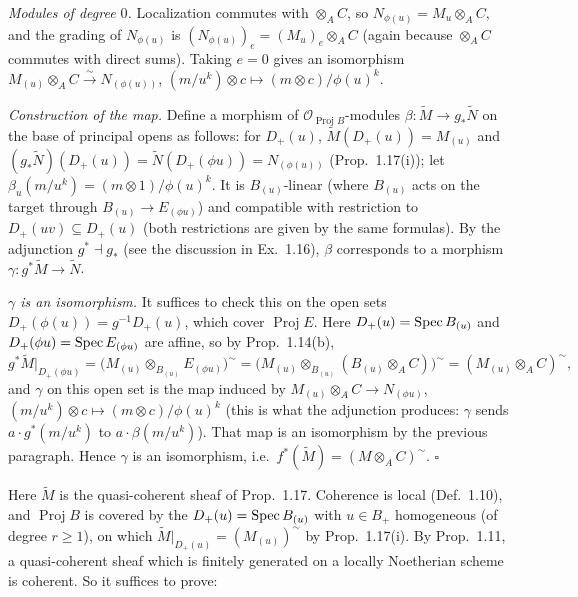 \documentclass[11pt]{article}
\begin{document}
\emph{Modules of degree $0$.} Localization commutes with $\otimes_AC$, so $N_{\phi(u)}=M_u\otimes_AC$, and the grading of $N_{\phi(u)}$ is $(N_{\phi(u)})_e=(M_u)_e\otimes_AC$ (again because $\otimes_AC$ commutes with direct sums). Taking $e=0$ gives an isomorphism $M_{(u)}\otimes_AC\xrightarrow{\sim}N_{(\phi(u))}$, $(m/u^k)\otimes c\mapsto(m\otimes c)/\phi(u)^k$.

\emph{Construction of the map.} Define a morphism of $\mathcal O_{\operatorname{Proj}B}$-modules $\beta:\widetilde M\to g_*\widetilde N$ on the base of principal opens as follows: for $D_+(u)$, $\widetilde M(D_+(u))=M_{(u)}$ and $(g_*\widetilde N)(D_+(u))=\widetilde N(D_+(\phi u))=N_{(\phi(u))}$ (Prop.~1.17(i)); let $\beta_u(m/u^k)=(m\otimes1)/\phi(u)^k$. It is $B_{(u)}$-linear (where $B_{(u)}$ acts on the target through $B_{(u)}\to E_{(\phi u)}$) and compatible with restriction to $D_+(uv)\subseteq D_+(u)$ (both restrictions are given by the same formulas). By the adjunction $g^*\dashv g_*$ (see the discussion in Ex.~1.16), $\beta$ corresponds to a morphism $\gamma:g^*\widetilde M\to\widetilde N$.

\emph{$\gamma$ is an isomorphism.} It suffices to check this on the open sets $D_+(\phi(u))=g^{-1}D_+(u)$, which cover $\operatorname{Proj}E$. Here $D_+(u)=\operatorname{Spec} B_{(u)}$ and $D_+(\phi u)=\operatorname{Spec} E_{(\phi u)}$ are affine, so by Prop.~1.14(b),
\[ g^*\widetilde M|_{D_+(\phi u)}=\bigl(M_{(u)}\otimes_{B_{(u)}}E_{(\phi u)}\bigr)^\sim=\bigl(M_{(u)}\otimes_{B_{(u)}}(B_{(u)}\otimes_AC)\bigr)^\sim=(M_{(u)}\otimes_AC)^\sim, \]
and $\gamma$ on this open set is the map induced by $M_{(u)}\otimes_AC\to N_{(\phi u)}$, $(m/u^k)\otimes c\mapsto(m\otimes c)/\phi(u)^k$ (this is what the adjunction produces: $\gamma$ sends $a\cdot g^*(m/u^k)$ to $a\cdot\beta(m/u^k)$). That map is an isomorphism by the previous paragraph. Hence $\gamma$ is an isomorphism, i.e.\ $f^*(\widetilde M)=(M\otimes_AC)^\sim$. \hfill$\square$

\pf
Here $\widetilde M$ is the quasi-coherent sheaf of Prop.~1.17. Coherence is local (Def.~1.10), and $\operatorname{Proj}B$ is covered by the $D_+(u)=\operatorname{Spec} B_{(u)}$ with $u\in B_+$ homogeneous (of degree $r\ge1$), on which $\widetilde M|_{D_+(u)}=(M_{(u)})^\sim$ by Prop.~1.17(i). By Prop.~1.11, a quasi-coherent sheaf which is finitely generated on a locally Noetherian scheme is coherent. So it suffices to prove:
\end{document}
